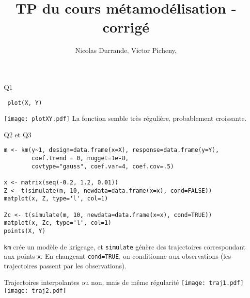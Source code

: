 \documentclass{beamer}
\title{TP du cours métamodélisation - corrigé}
\author{Nicolas Durrande, Victor Picheny,}
\date{\null}
\begin{document}
\begin{frame}
  \titlepage
\end{frame}

\begin{frame}[fragile]{Q1}
\begin{verbatim}
 plot(X, Y)
\end{verbatim}
\texttt{[image: plotXY.pdf]}
La fonction semble très régulière, probablement croissante.
\end{frame}

\begin{frame}[fragile]{Q2 et Q3}
 \begin{Verbatim}[fontsize=\small]
m <- km(y~1, design=data.frame(x=X), response=data.frame(y=Y),
        coef.trend = 0, nugget=1e-8,
        covtype="gauss", coef.var=4, coef.cov=.5)

x <- matrix(seq(-0.2, 1.2, 0.01))
Z <- t(simulate(m, 10, newdata=data.frame(x=x), cond=FALSE))
matplot(x, Z, type='l', col=1)

Zc <- t(simulate(m, 10, newdata=data.frame(x=x), cond=TRUE))
matplot(x, Zc, type='l', col=1)
points(X, Y)
\end{Verbatim}

\texttt{km} crée un modèle de krigeage, et \texttt{simulate} génère des trajectoires correspondant aux points \texttt{x}. 
En changeant \texttt{cond=TRUE}, on conditionne aux observations (les trajectoires passent par les observations).

\end{frame}
\begin{frame}{Trajectoires interpolantes ou non, mais de même régularité}
\texttt{[image: traj1.pdf]} 
\texttt{[image: traj2.pdf]} 
\end{frame}
\end{document}
